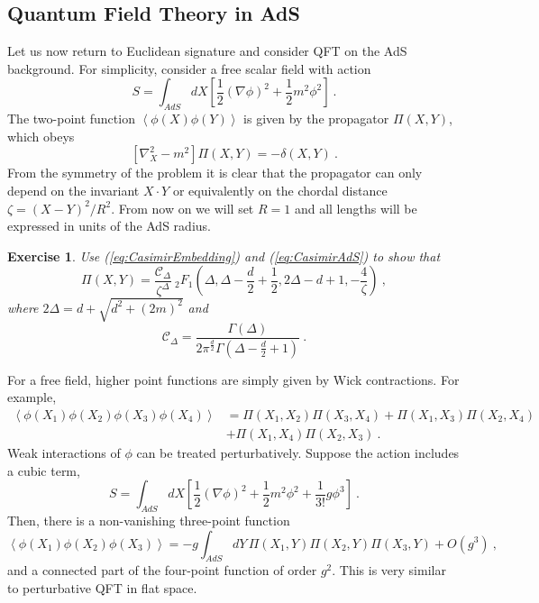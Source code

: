 \documentclass{ws-rv9x6}
\newtheorem{exercise}{Exercise}[section]
\newcommand\be{\begin{equation}}
\newcommand\ee{\end{equation}}
\begin{document}
\subsection{Quantum Field Theory in AdS}

Let us now return to Euclidean signature and consider QFT on the AdS
background. For simplicity, consider a free scalar field with action
\be
S=\int_{AdS}dX\left[\frac{1}{2}\left(\nabla\phi\right)^{2}+\frac{1}{2}m^{2}\phi^{2}\right]\ .
\ee
The two-point function $\left\langle \phi(X)\phi(Y)\right\rangle $
is given by the propagator $\Pi(X,Y)$, which obeys
\be
\left[\nabla_{X}^{2}-m^{2}\right]\Pi(X,Y)=-\delta(X,Y)\ .
\ee
From the symmetry of the problem it is clear that the propagator can
only depend on the invariant $X\cdot Y$ or equivalently on the chordal distance
$\zeta=(X-Y)^{2}/R^{2}$. From now on we will set $R=1$ and all
lengths will be expressed in units of the AdS radius.
\begin{exercise} 
Use (\ref{eq:CasimirEmbedding}) and (\ref{eq:CasimirAdS})
to show that
\be
\Pi(X,Y)=\frac{\mathcal{C}_{\Delta}}{\zeta^{\Delta}}\ _{2}F_{1}\left(\Delta,\Delta-\frac{d}{2}+\frac{1}{2},2\Delta-d+1,-\frac{4}{\zeta}\right)\ ,
\ee
where $2\Delta=d+\sqrt{d^{2}+(2m)^{2}}$ and 
\be
\mathcal{C}_{\Delta}=\frac{\Gamma(\Delta)}{2\pi^{\frac{d}{2}}\Gamma\left(\Delta-\frac{d}{2}+1\right)}\ .
\ee
\end{exercise}
 

For a free field, higher point functions are simply given by Wick
contractions. For example,
\begin{align}
\left\langle \phi(X_{1})\phi(X_{2})\phi(X_{3})\phi(X_{4})\right\rangle &=\Pi(X_{1},X_{2})\Pi(X_{3},X_{4})
+\Pi(X_{1},X_{3})\Pi(X_{2},X_{4})\nonumber \\
&+\Pi(X_{1},X_{4})\Pi(X_{2},X_{3})\ .\label{eq:Disconnected4ptAdS}
\end{align}
Weak interactions of $\phi$ can be treated perturbatively. Suppose
the action includes a cubic term, 
\begin{equation}
S=\int_{AdS}dX\left[\frac{1}{2}\left(\nabla\phi\right)^{2}+\frac{1}{2}m^{2}\phi^{2}+\frac{1}{3!}g\phi^{3}\right]\ .\label{eq:actionAdSscalar}
\end{equation}
Then, there is a non-vanishing three-point function
\be
\left\langle \phi(X_{1})\phi(X_{2})\phi(X_{3})\right\rangle =-g\int_{AdS}dY\,\Pi(X_{1},Y)\Pi(X_{2},Y)\Pi(X_{3},Y)+O(g^{3})\ , \nonumber
\ee
and a connected part of the four-point function of order $g^{2}$.
This is very similar to perturbative QFT in flat space. 
\end{document}
